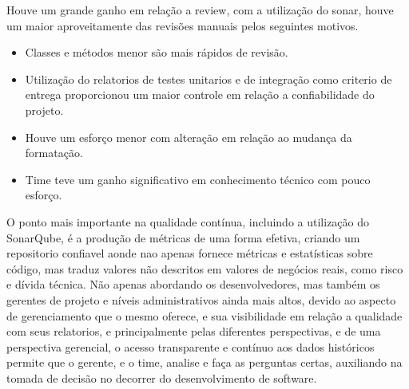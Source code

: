 \documentclass[12pt]{article}
\begin{document}
Houve um grande ganho em relação a review, com a utilização do sonar, houve um maior aproveitamente das revisões manuais pelos seguintes motivos.
 \begin{itemize}
	\item Classes e métodos menor são mais rápidos de revisão.
  \item Utilização do relatorios de testes unitarios e de integração como criterio de entrega proporcionou um maior controle em relação a confiabilidade do projeto.
	\item Houve um esforço menor com alteração em relação ao mudança da formatação.
	\item Time teve um ganho significativo em conhecimento técnico com pouco esforço.
\end{itemize}

O ponto mais importante na qualidade contínua, incluindo a utilização do SonarQube, é a produção de métricas de uma forma efetiva, criando um repositorio confiavel aonde nao apenas fornece métricas e estatísticas sobre código, mas traduz valores não descritos em valores de negócios reais, como risco e dívida técnica.
Não apenas abordando os desenvolvedores, mas também os gerentes de projeto e níveis administrativos ainda mais altos, devido ao aspecto de gerenciamento que o mesmo oferece, e sua visibilidade em relação a qualidade com seus relatorios, e principalmente pelas diferentes perspectivas, e de uma perspectiva gerencial, o acesso transparente e contínuo aos dados históricos permite que o gerente, e o time, analise e faça as perguntas certas,  auxiliando na tomada de decisão no decorrer do desenvolvimento de software.

\newpage
%


\end{document}

